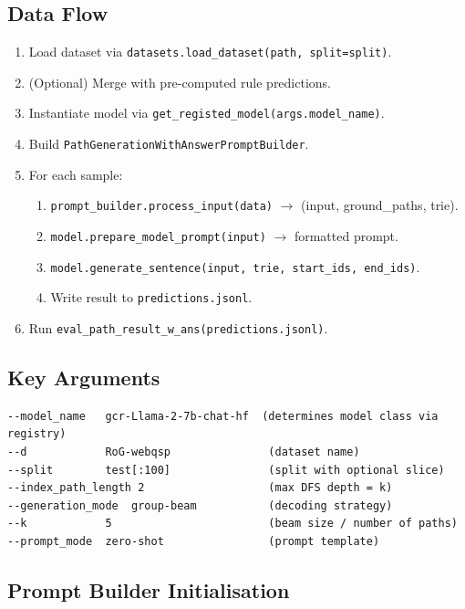 \documentclass[11pt,a4paper,oneside,openany]{book}
\theoremstyle{definition}
\newcommand{\code}[1]{\texttt{#1}}
\begin{document}
\subsection{Data Flow}

\begin{enumerate}
	\item Load dataset via \code{datasets.load\_dataset(path, split=split)}.
	\item (Optional) Merge with pre-computed rule predictions.
	\item Instantiate model via \code{get\_registed\_model(args.model\_name)}.
	\item Build \code{PathGenerationWithAnswerPromptBuilder}.
	\item For each sample:
	      \begin{enumerate}
		      \item \code{prompt\_builder.process\_input(data)} $\to$ (input, ground\_paths, trie).
		      \item \code{model.prepare\_model\_prompt(input)} $\to$ formatted prompt.
		      \item \code{model.generate\_sentence(input, trie, start\_ids, end\_ids)}.
		      \item Write result to \code{predictions.jsonl}.
	      \end{enumerate}
	\item Run \code{eval\_path\_result\_w\_ans(predictions.jsonl)}.
\end{enumerate}

\subsection{Key Arguments}

\begin{lstlisting}[numbers=none]
--model_name   gcr-Llama-2-7b-chat-hf  (determines model class via registry)
--d            RoG-webqsp               (dataset name)
--split        test[:100]               (split with optional slice)
--index_path_length 2                   (max DFS depth = k)
--generation_mode  group-beam           (decoding strategy)
--k            5                        (beam size / number of paths)
--prompt_mode  zero-shot                (prompt template)
\end{lstlisting}

\subsection{Prompt Builder Initialisation}
\end{document}
